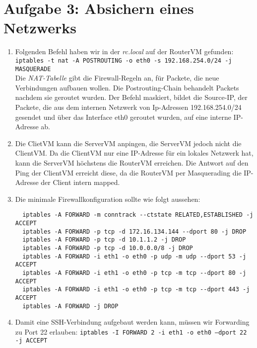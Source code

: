 \documentclass{scrartcl}
\begin{document}
	\section*{Aufgabe 3: Absichern eines Netzwerks}
	\label{sec:Absichern eines Netzwerks}
	\begin{enumerate}[\bfseries 1.]
		\item
		      Folgenden Befehl haben wir in der \textit{rc.local} auf der RouterVM gefunden:\\
		      \texttt{iptables -t nat -A POSTROUTING -o eth0 -s 192.168.254.0/24 -j MASQUERADE}\\
		      Die \textit{NAT-Tabelle} gibt die Firewall-Regeln an, für Packete, die neue
		      Verbindungen aufbauen wollen. Die Postrouting-Chain behandelt Packets nachdem
		      sie geroutet wurden. Der Befehl maskiert, bildet die Source-IP, der Packete,
		      die aus dem internen Netzwerk von Ip-Adressen 192.168.254.0/24 gesendet und
		      über das Interface eth0 geroutet wurden, auf eine interne IP-Adresse ab.

		\item
          Die ClietVM kann die ServerVM anpingen, die ServerVM jedoch nicht die
          ClientVM. Da die ClientVM nur eine IP-Adresse für ein lokales Netzwerk
          hat, kann die ServerVM höchstens die RouterVM erreichen. Die Antwort auf
          den Ping der ClientVM erreicht diese, da die RouterVM per Masquerading
          die IP-Adresse der Client intern mapped.
          
		\item
		      Die minimale Firewallkonfiguration sollte wie folgt aussehen:
		      \begin{lstlisting}
  iptables -A FORWARD -m conntrack --ctstate RELATED,ESTABLISHED -j ACCEPT
  iptables -A FORWARD -p tcp -d 172.16.134.144 --dport 80 -j DROP
  iptables -A FORWARD -p tcp -d 10.1.1.2 -j DROP
  iptables -A FORWARD -p tcp -d 10.0.0.0/8 -j DROP
  iptables -A FORWARD -i eth1 -o eth0 -p udp -m udp --dport 53 -j ACCEPT
  iptables -A FORWARD -i eth1 -o eth0 -p tcp -m tcp --dport 80 -j ACCEPT
  iptables -A FORWARD -i eth1 -o eth0 -p tcp -m tcp --dport 443 -j ACCEPT
  iptables -A FORWARD -j DROP
		\end{lstlisting}

		\item
		      Damit eine SSH-Verbindung aufgebaut werden kann, müssen wir Forwarding zu Port
		      22 erlauben: \texttt{iptables -I FORWARD 2 -i eth1 -o eth0 --dport 22 -j ACCEPT}


\end{enumerate}
\end{document}
